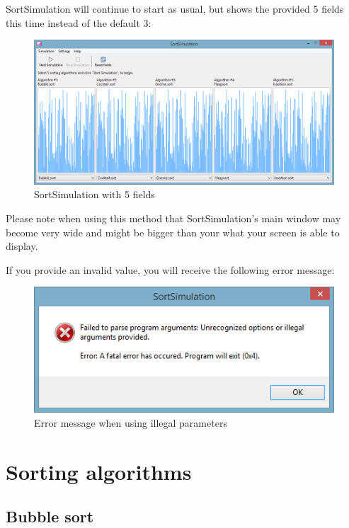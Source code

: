 \documentclass[]{pfBook}
\begin{document}
	SortSimulation will continue to start as usual, but shows the provided 5 fields this time instead of the default 3:
	
	\begin{figure}[h]
		\centering
		\includegraphics[scale=0.6]{images/image2.png}
		\caption{SortSimulation with 5 fields}
		\label{fig:5fields}
	\end{figure}
	
	Please note when using this method that SortSimulation's main window may become very wide and might be bigger than your what your screen is able to display.
	
	If you provide an invalid value, you will receive the following error message:
	
	\begin{figure}[h]
		\centering
		\includegraphics[scale=0.6]{images/image3.png}
		\caption{Error message when using illegal parameters}
		\label{fig:parameterserror}
	\end{figure}
	
	\section{Sorting algorithms}
	
	\subsection{Bubble sort}
	
\end{document}
